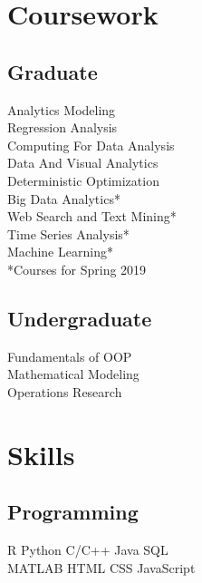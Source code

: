 \documentclass[]{deedy-resume-openfont}
\begin{document}
\begin{minipage}[t]{0.31\textwidth}

\section{Coursework}
\subsection{Graduate}
Analytics Modeling \\ 
Regression Analysis \\
Computing For Data Analysis \\
Data And Visual Analytics \\
Deterministic Optimization \\
Big Data Analytics* \\
Web Search and Text Mining* \\
Time Series Analysis* \\
Machine Learning* \\
\vspace{0.75mm}
{\scriptsize{*Courses for Spring 2019}}
\sectionsep

\subsection{Undergraduate}
Fundamentals of OOP \\
Mathematical Modeling \\
Operations Research
\sectionsep



\section{Skills}
\subsection{Programming}
\textbullet{} R \textbullet{} Python \textbullet{} C/C++ \textbullet{} Java \textbullet{} SQL \\
\textbullet{} MATLAB \textbullet{} HTML \textbullet{} CSS \textbullet{} JavaScript 
\sectionsep


\end{minipage}
\end{document}
